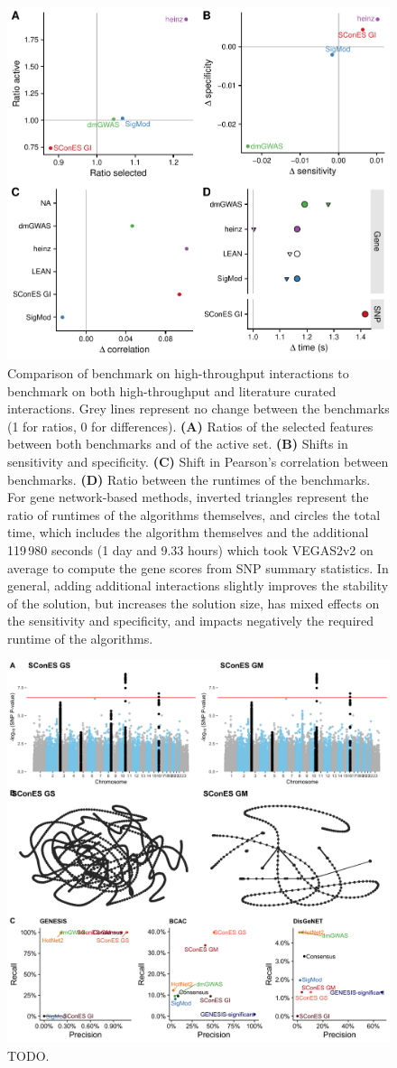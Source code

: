 \documentclass[twocolumn, 11pt]{article}
\begin{document}
\begin{figure}[htbp]
\centering
\includegraphics[width=.85\linewidth]{./figures/sfigure_7.pdf}
\caption{\label{sfig:lc_ht_comparison}
Comparison of benchmark on high-throughput interactions to benchmark on both high-throughput and literature curated interactions. Grey lines represent no change between the benchmarks (1 for ratios, 0 for differences). \textbf{(A)} Ratios of the selected features between both benchmarks and of the active set. \textbf{(B)} Shifts in sensitivity and specificity. \textbf{(C)} Shift in Pearson's correlation between benchmarks. \textbf{(D)} Ratio between the runtimes of the benchmarks. For gene network-based methods, inverted triangles represent the ratio of runtimes of the algorithms themselves, and circles the total time, which includes the algorithm themselves and the additional 119\,980 seconds (1 day and 9.33 hours) which took VEGAS2v2 on average to compute the gene scores from SNP summary statistics. In general, adding additional interactions slightly improves the stability of the solution, but increases the solution size, has mixed effects on the sensitivity and specificity, and impacts negatively the required runtime of the algorithms.}
\end{figure}

\begin{figure}[htbp]
  \centering
  \includegraphics[width=.9\linewidth]{./figures/sfigure_8.png}
  \caption{\label{sfig:scones_gsm} TODO.}
\end{figure}
\end{document}
